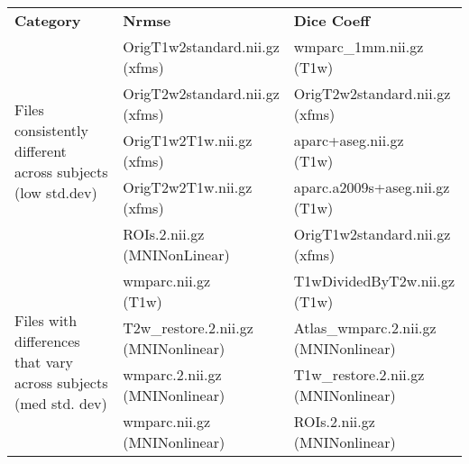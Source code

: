 \begin{center}
\begin{longtable}{|p{}|p{}|p{}|}
\cline{1-3}
\textbf{Category} & \textbf{Nrmse} & \textbf{Dice Coeff} \\\cline{1-3}
\multirow{5}{.3\textwidth}{Files consistently different across subjects (low std.dev)}     & \makecell[l]{OrigT1w2standard.nii.gz \\ (xfms)}  & \makecell[l]{wmparc\_1mm.nii.gz\\(T1w)} \\\cline{2-3}
& \makecell[l]{OrigT2w2standard.nii.gz\\(xfms)}                   & \makecell[l]{OrigT2w2standard.nii.gz\\(xfms)} \\\cline{2-3}
& \makecell[l]{OrigT1w2T1w.nii.gz\\(xfms)}                        & \makecell[l]{aparc+aseg.nii.gz\\(T1w)} \\\cline{2-3}
& \makecell[l]{OrigT2w2T1w.nii.gz\\(xfms)}                        & \makecell[l]{aparc.a2009s+aseg.nii.gz\\(T1w)} \\\cline{2-3}
& \makecell[l]{ROIs.2.nii.gz\\(MNINonLinear)}                     & \makecell[l]{OrigT1w2standard.nii.gz\\(xfms)} \\\cline{1-3}
\multirow{5}{.3\textwidth}{Files with differences that vary across subjects (med std. dev)} & \makecell[l]{wmparc.nii.gz\\(T1w)}  & \makecell[l]{T1wDividedByT2w.nii.gz\\(T1w)} \\\cline{2-3}
& \makecell[l]{T2w\_restore.2.nii.gz\\(MNINonlinear)}                       & \makecell[l]{Atlas\_wmparc.2.nii.gz\\(MNINonlinear)} \\\cline{2-3}
& \makecell[l]{wmparc.2.nii.gz\\(MNINonlinear)}                           & \makecell[l]{T1w\_restore.2.nii.gz\\(MNINonlinear)} \\\cline{2-3}
& \makecell[l]{wmparc.nii.gz\\(MNINonlinear)}                      & \makecell[l]{ROIs.2.nii.gz\\(MNINonlinear)} \\\cline{2-3}

\end{longtable}
\end{center}
